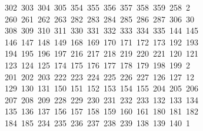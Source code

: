 \begin{tabbing}
\ 302\ 303\ 304\ 305\ 354\ 355\ 356\ 357\ 358\ 359\ 258\ 2\\[0pt]
\ 260\ 261\ 262\ 263\ 282\ 283\ 284\ 285\ 286\ 287\ 306\ 30\\[0pt]
\ 308\ 309\ 310\ 311\ 330\ 331\ 332\ 333\ 334\ 335\ 144\ 145\\[0pt]
\>\ 146\ 147\ 148\ 149\ 168\ 169\ 170\ 171\ 172\ 173\ 192\ 193\\[0pt]
\>\ 194\ 195\ 196\ 197\ 216\ 217\ 218\ 219\ 220\ 221\ 120\ 121\ \\[0pt]
\ 123\ 124\ 125\ 174\ 175\ 176\ 177\ 178\ 179\ 198\ 199\ 2\\[0pt]
\ 201\ 202\ 203\ 222\ 223\ 224\ 225\ 226\ 227\ 126\ 127\ 12\\[0pt]
\ 129\ 130\ 131\ 150\ 151\ 152\ 153\ 154\ 155\ 204\ 205\ 206\\[0pt]
\>\ 207\ 208\ 209\ 228\ 229\ 230\ 231\ 232\ 233\ 132\ 133\ 134\\[0pt]
\>\ 135\ 136\ 137\ 156\ 157\ 158\ 159\ 160\ 161\ 180\ 181\ 182\ \\[0pt]
\ 184\ 185\ 234\ 235\ 236\ 237\ 238\ 239\ 138\ 139\ 140\ 1\\[0pt]

\end{tabbing}
